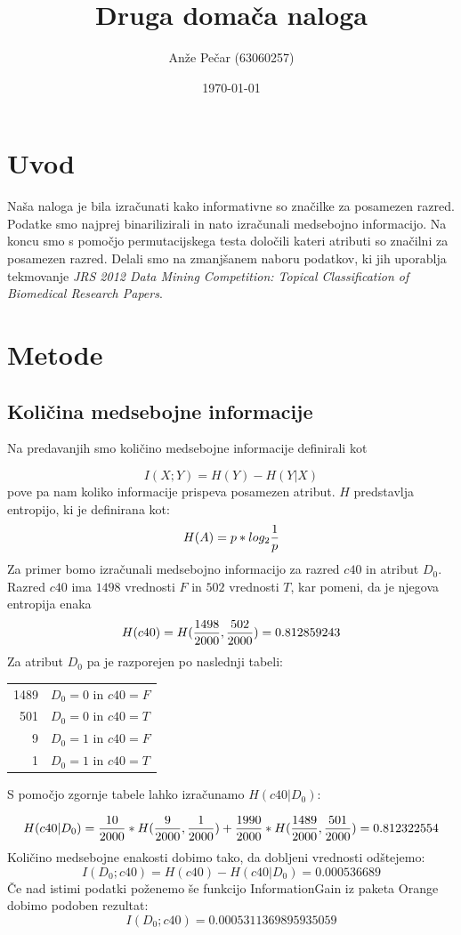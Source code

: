 \documentclass[a4paper,11pt]{article}
\title{Druga domača naloga}
\author{Anže Pečar (63060257)}
\date{\today}
\begin{document}
\maketitle

\section{Uvod}

Naša naloga je bila izračunati kako informativne so značilke za posamezen razred. Podatke smo najprej binarilizirali in nato izračunali medsebojno informacijo. Na koncu smo s pomočjo permutacijskega testa določili kateri atributi so značilni za posamezen razred. Delali smo na zmanjšanem naboru podatkov, ki jih uporablja tekmovanje \textit{JRS 2012 Data Mining Competition: Topical Classification of Biomedical Research Papers}.

\section{Metode}
\subsection{Količina medsebojne informacije}
Na predavanjih smo količino medsebojne informacije definirali kot

\[ 
	I(X;Y) = H(Y) - H(Y|X)
\]
pove pa nam koliko informacije prispeva posamezen atribut. $H$ predstavlja entropijo, ki je definirana kot:
\[
	H(A) = p * log_2 {1 \over p}
\]
Za primer bomo izračunali medsebojno informacijo za razred $c40$ in atribut $D_0$. Razred $c40$ ima $1498$ vrednosti $F$ in $502$ vrednosti $T$, kar pomeni, da je njegova entropija enaka 
\[
	H(c40) = H({1498 \over 2000}, {502\over 2000}) = 0.812859243
\]
Za atribut $D_0$ pa je razporejen po naslednji tabeli:

\begin{tabular}{r|l}
  1489 & $D_0=0$ in $c40=F$ \\
  501 & $D_0=0$ in $c40=T$ \\
  9 & $D_0 = 1$ in $c40=F$ \\
  1 & $D_0 = 1$ in $c40=T$ \\
\end{tabular}

S pomočjo zgornje tabele lahko izračunamo $H(c40|D_0)$:

\[
	H(c40|D_0) = {10\over2000}*H({9\over2000}, {1\over2000}) + {1990\over2000}*H({1489\over2000}, {501\over2000}) = 0.812322554
\]
Količino medsebojne enakosti dobimo tako, da dobljeni vrednosti odštejemo:
\[
	I(D_0;c40) = H(c40) - H(c40|D_0) = 0.000536689
\]
Če nad istimi podatki poženemo še funkcijo InformationGain iz paketa Orange dobimo podoben rezultat:
\[
I(D_0;c40) = 0.0005311369895935059
\]
\end{document}
